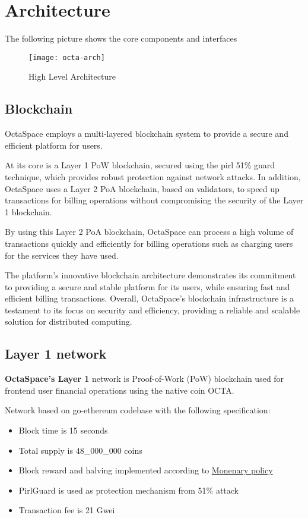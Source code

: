 \section{Architecture}

The following picture shows the core components and interfaces

\begin{figure}[h]
    \centering
    \texttt{[image: octa-arch]}
    \caption{High Level Architecture}
\end{figure}

\subsection{Blockchain}
OctaSpace employs a multi-layered blockchain system to provide a secure and efficient platform for users.

At its core is a Layer 1 PoW blockchain, secured using the pirl 51\% guard technique, which provides robust protection against network attacks.
In addition, OctaSpace uses a Layer 2 PoA blockchain, based on validators, to speed up transactions for billing operations without compromising the security of the Layer 1 blockchain.

By using this Layer 2 PoA blockchain, OctaSpace can process a high volume of transactions quickly and efficiently
for billing operations such as charging users for the services they have used.

The platform's innovative blockchain architecture demonstrates its commitment to providing a secure and stable platform for its users, while ensuring fast and efficient billing transactions.
Overall, OctaSpace's blockchain infrastructure is a testament to its focus on security and efficiency, providing a reliable and scalable solution for distributed computing.

\newpage

\subsection{Layer 1 network}

\textbf{OctaSpace's Layer 1} network is Proof-of-Work (PoW\cite{pow}) blockchain used for frontend user financial operations using the native coin OCTA.

Network based on go-ethereum\cite{go-ethereum} codebase with the following specification:

\begin{itemize}
    \item Block time is 15 seconds
    \item Total supply is 48\_000\_000 coins
    \item Block reward and halving implemented according to \hyperref[sec:mp]{Monenary policy}
    \item PirlGuard is used as protection mechanism from 51\% attack
    \item Transaction fee is 21 Gwei
\end{itemize}

